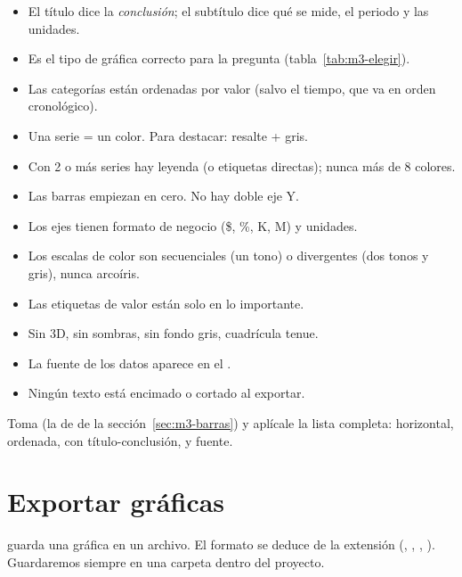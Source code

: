 \begin{itemize}
  \item[\ding{51}] El título dice la \emph{conclusión}; el subtítulo dice
        qué se mide, el periodo y las unidades.
  \item[\ding{51}] Es el tipo de gráfica correcto para la pregunta
        (tabla~\ref{tab:m3-elegir}).
  \item[\ding{51}] Las categorías están ordenadas por valor (salvo el tiempo,
        que va en orden cronológico).
  \item[\ding{51}] Una serie = un color. Para destacar: resalte + gris.
  \item[\ding{51}] Con 2 o más series hay leyenda (o etiquetas directas);
        nunca más de 8 colores.
  \item[\ding{51}] Las barras empiezan en cero. No hay doble eje Y.
  \item[\ding{51}] Los ejes tienen formato de negocio (\$, \%, K, M) y
        unidades.
  \item[\ding{51}] Los escalas de color son secuenciales (un tono) o
        divergentes (dos tonos y gris), nunca arcoíris.
  \item[\ding{51}] Las etiquetas de valor están solo en lo importante.
  \item[\ding{51}] Sin 3D, sin sombras, sin fondo gris, cuadrícula tenue.
  \item[\ding{51}] La fuente de los datos aparece en el .
  \item[\ding{51}] Ningún texto está encimado o cortado al exportar.
\end{itemize}

\begin{hazlotu}
Toma  (la de  de la
sección~\ref{sec:m3-barras}) y aplícale la lista completa: horizontal,
ordenada, con título-conclusión,  y fuente.
\end{hazlotu}

\section{Exportar gráficas}
\label{sec:m3-exportar}

 guarda una gráfica en un archivo. El formato se deduce de
la extensión (, , ,
). Guardaremos siempre en una carpeta 
dentro del proyecto.


